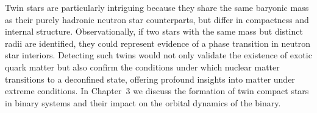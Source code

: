 \documentclass[main.tex]{subfiles}
\begin{document}
    Twin stars are particularly intriguing because they share the same baryonic mass as their purely hadronic neutron star counterparts, but differ in compactness and internal structure. Observationally, if two stars with the same mass but distinct radii are identified, they could represent evidence of a phase transition in neutron star interiors. Detecting such twins would not only validate the existence of exotic quark matter but also confirm the conditions under which nuclear matter transitions to a deconfined state, offering profound insights into matter under extreme conditions. In Chapter~3 we discuss the formation of twin compact stars in binary systems and their impact on the orbital dynamics of the binary.
    


    






    

\end{document}
